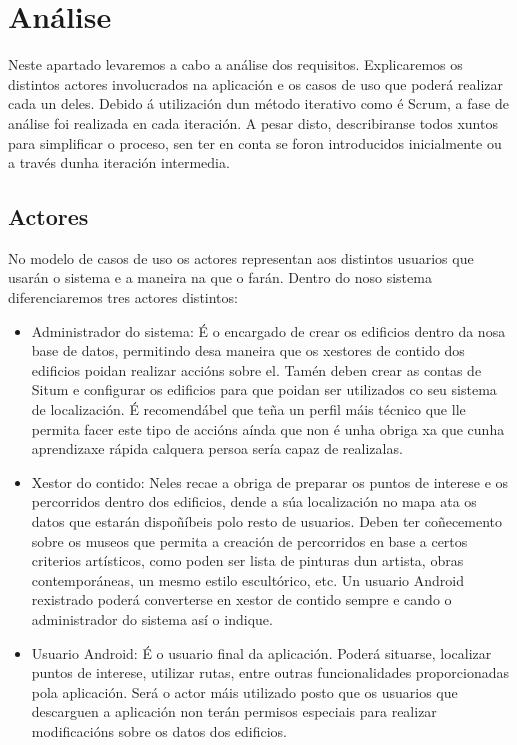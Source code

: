 \chapter{Análise}

Neste apartado levaremos a cabo a análise dos requisitos. Explicaremos os distintos actores involucrados na aplicación e os casos de uso que poderá realizar cada un deles. Debido á utilización dun método iterativo como é Scrum, a fase de análise foi realizada en cada iteración. A pesar disto, describiranse todos xuntos para simplificar o proceso, sen ter en conta se foron introducidos inicialmente ou a través dunha iteración intermedia.


\section{Actores}

No modelo de casos de uso os actores representan aos distintos usuarios que usarán o sistema e a maneira na que o farán. Dentro do noso sistema diferenciaremos tres actores distintos:

\begin{itemize}
	\item Administrador do sistema: É o encargado de crear os edificios dentro da nosa base de datos, permitindo desa maneira que os xestores de contido dos edificios poidan realizar accións sobre el. Tamén deben crear as contas de Situm e configurar os edificios para que poidan ser utilizados co seu sistema de localización. É recomendábel que teña un perfil máis técnico que lle permita facer este tipo de accións aínda que non é unha obriga xa que cunha aprendizaxe rápida calquera persoa sería capaz de realizalas.
	\item Xestor do contido: Neles recae a obriga de preparar os puntos de interese e os percorridos dentro dos edificios, dende a súa localización no mapa ata os datos que estarán dispoñíbeis polo resto de usuarios. Deben ter coñecemento sobre os museos que permita a creación de percorridos en base a certos criterios artísticos, como poden ser lista de pinturas dun artista, obras contemporáneas, un mesmo estilo escultórico, etc. Un usuario Android rexistrado poderá converterse en xestor de contido sempre e cando o administrador do sistema así o indique.
	\item Usuario Android: É o usuario final da aplicación. Poderá situarse, localizar puntos de interese, utilizar rutas, entre outras funcionalidades proporcionadas pola aplicación. Será o actor máis utilizado posto que os usuarios que descarguen a aplicación non terán permisos especiais para realizar modificacións sobre os datos dos edificios.
\end{itemize}


